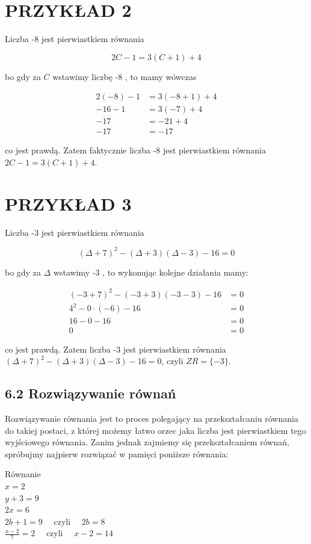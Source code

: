 \documentclass[10pt]{article}
\begin{document}
\section*{PRZYKŁAD 2}
Liczba -8 jest pierwiastkiem równania

\[
2 C-1=3(C+1)+4
\]

bo gdy za \(C\) wstawimy liczbę -8 , to mamy wówczas

\[
\begin{aligned}
2(-8)-1 & =3(-8+1)+4 \\
-16-1 & =3(-7)+4 \\
-17 & =-21+4 \\
-17 & =-17
\end{aligned}
\]

co jest prawdą. Zatem faktycznie liczba -8 jest pierwiastkiem równania \(2 C-1=3(C+1)+4\).

\section*{PRZYKŁAD 3}
Liczba -3 jest pierwiastkiem równania

\[
(\Delta+7)^{2}-(\Delta+3)(\Delta-3)-16=0
\]

bo gdy za \(\Delta\) wstawimy -3 , to wykonując kolejne działania mamy:

\[
\begin{aligned}
(-3+7)^{2}-(-3+3)(-3-3)-16 & =0 \\
4^{2}-0 \cdot(-6)-16 & =0 \\
16-0-16 & =0 \\
0 & =0
\end{aligned}
\]

co jest prawdą. Zatem liczba -3 jest pierwiastkiem równania \((\Delta+7)^{2}-(\Delta+3)(\Delta-3)-16=0\), czyli \(Z R=\{-3\}\).

\subsection*{6.2 Rozwiązywanie równań}
Rozwiązywanie równania jest to proces polegający na przekształcaniu równania do takiej postaci, z której możemy łatwo orzec jaka liczba jest pierwiastkiem tego wyjściowego równania. Zanim jednak zajmiemy się przekształcaniem równań, spróbujmy najpierw rozwiązać w pamięci poniższe równania:

Równanie\\
\(x=2\)\\
\(y+3=9\)\\
\(2 x=6\)\\
\(2 b+1=9 \quad\) czyli \(\quad 2 b=8\)\\
\(\frac{x-2}{7}=2 \quad\) czyli \(\quad x-2=14\)
\end{document}
